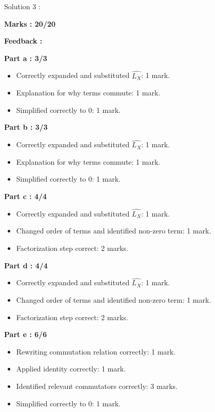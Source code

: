 \documentclass[a4paper,11pt]{article}
\begin{document}
Solution 3 :

\textbf{Marks : 20/20}

\textbf{Feedback :}

\textbf{Part a : 3/3}

\begin{itemize}
    \item Correctly expanded and substituted $\hat{L_X}$: 1 mark.
    \item Explanation for why terms commute: 1 mark.
    \item Simplified correctly to 0: 1 mark.
\end{itemize}


\textbf{Part b : 3/3}

\begin{itemize}
    \item Correctly expanded and substituted $\hat{L_X}$: 1 mark.
    \item Explanation for why terms commute: 1 mark.
    \item Simplified correctly to 0: 1 mark.
\end{itemize}


\textbf{Part c : 4/4}

\begin{itemize}
    \item Correctly expanded and substituted $\hat{L_X}$: 1 mark.
    \item Changed order of terms and identified non-zero term: 1 mark.
    \item Factorization step correct: 2 marks.
\end{itemize}


\textbf{Part d : 4/4}

\begin{itemize}
    \item Correctly expanded and substituted $\hat{L_X}$: 1 mark.
    \item Changed order of terms and identified non-zero term: 1 mark.
    \item Factorization step correct: 2 marks.
\end{itemize}



\textbf{Part e : 6/6}

\begin{itemize}
    \item Rewriting commutation relation correctly: 1 mark.
    \item Applied identity correctly: 1 mark.
    \item Identified relevant commutators correctly: 3 marks.
    \item Simplified correctly to 0: 1 mark.
\end{itemize}
\end{document}
